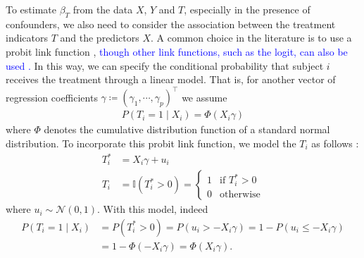 \documentclass[preprint,12pt]{elsarticle}
\newcommand{\added}[1]{\textcolor{blue}{#1}}
\begin{document}
To estimate $\beta_T$ from the data $X$, $Y$ and $T$,
especially in the presence of confounders,
we also need to consider the
association between the treatment indicators $T$ and the predictors $X$.
A common choice in the literature is to use a probit link function
\citep{winship99},
\added{%
though other link functions, such as the logit, can also be used
\citep{HECKMAN1985}.%
}
In this way, we can
specify the conditional probability that subject $i$ receives the treatment through a linear model. 
That is, for another vector of regression coefficients 
$\gamma\coloneqq(\gamma_1, \cdots, \gamma_p)^{\top}$ we
assume
\begin{align}
	P(T_i=1\mid X_i) = \Phi(X_i\gamma)
\end{align}
where $\Phi$ denotes the cumulative distribution function
of a standard normal distribution. To incorporate this probit
link function, we model the $T_i$ as follows \citep{albert93}:
\begin{align}
    T_i^* &= X_i\gamma +u_i \\
    T_i   &= \mathbb{I}(T_i^*>0)
    =
    \begin{cases}
    1 & \text{if }T_i^*>0 \\
    0 & \text{otherwise}
    \end{cases}
\end{align}
where $u_i\sim\mathcal{N}(0,1)$.
With this model, indeed
\begin{align}
  P(T_i=1\mid X_i)
  &=P(T_i^*>0)=P(u_i>-X_i\gamma)=1-P(u_i\le -X_i\gamma) \\
  &=1-\Phi(-X_i\gamma)=\Phi(X_i\gamma).
\end{align}
\end{document}
